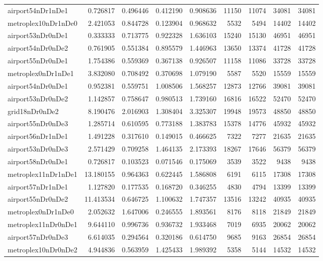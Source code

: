\begin{longtable}{|l|r|r|r|r|r|r|r|r|}
airport54nDr1nDe1 & 0.726817 & 0.496446 & 0.412190 & 0.908636 & 11150 & 11074 & 34081 & 34081 \\
metroplex10nDr1nDe0 & 2.421053 & 0.844728 & 0.123904 & 0.968632 & 5532 & 5494 & 14402 & 14402 \\
airport53nDr0nDe1 & 0.333333 & 0.713775 & 0.922328 & 1.636103 & 15240 & 15130 & 46951 & 46951 \\
airport54nDr0nDe2 & 0.761905 & 0.551384 & 0.895579 & 1.446963 & 13650 & 13374 & 41728 & 41728 \\
airport55nDr0nDe1 & 1.754386 & 0.559369 & 0.367138 & 0.926507 & 11158 & 11086 & 33728 & 33728 \\
metroplex0nDr1nDe1 & 3.832080 & 0.708492 & 0.370698 & 1.079190 & 5587 & 5520 & 15559 & 15559 \\
airport54nDr0nDe1 & 0.952381 & 0.559751 & 1.008506 & 1.568257 & 12873 & 12766 & 39081 & 39081 \\
airport53nDr0nDe2 & 1.142857 & 0.758647 & 0.980513 & 1.739160 & 16816 & 16522 & 52470 & 52470 \\
grid18nDr0nDe2 & 8.190476 & 2.016903 & 1.308404 & 3.325307 & 19948 & 19573 & 48850 & 48850 \\
airport55nDr0nDe3 & 1.285714 & 0.610595 & 0.773188 & 1.383783 & 15378 & 14776 & 45932 & 45932 \\
airport56nDr1nDe1 & 1.491228 & 0.317610 & 0.149015 & 0.466625 & 7322 & 7277 & 21635 & 21635 \\
airport53nDr0nDe3 & 2.571429 & 0.709258 & 1.464135 & 2.173393 & 18267 & 17646 & 56379 & 56379 \\
airport58nDr0nDe1 & 0.726817 & 0.103523 & 0.071546 & 0.175069 & 3539 & 3522 & 9438 & 9438 \\
metroplex11nDr1nDe1 & 13.180155 & 0.964363 & 0.622445 & 1.586808 & 6191 & 6115 & 17308 & 17308 \\
airport57nDr1nDe1 & 1.127820 & 0.177535 & 0.168720 & 0.346255 & 4830 & 4794 & 13399 & 13399 \\
airport55nDr0nDe2 & 11.413534 & 0.646725 & 1.100632 & 1.747357 & 13516 & 13242 & 40935 & 40935 \\
metroplex0nDr1nDe0 & 2.052632 & 1.647006 & 0.246555 & 1.893561 & 8176 & 8118 & 21849 & 21849 \\
metroplex11nDr0nDe1 & 9.644110 & 0.996736 & 0.936732 & 1.933468 & 7019 & 6935 & 20062 & 20062 \\
airport57nDr0nDe3 & 6.614035 & 0.294564 & 0.320186 & 0.614750 & 9685 & 9163 & 26854 & 26854 \\
metroplex10nDr0nDe2 & 4.944836 & 0.563959 & 1.425433 & 1.989392 & 5358 & 5144 & 14532 & 14532 \\

\end{longtable}
